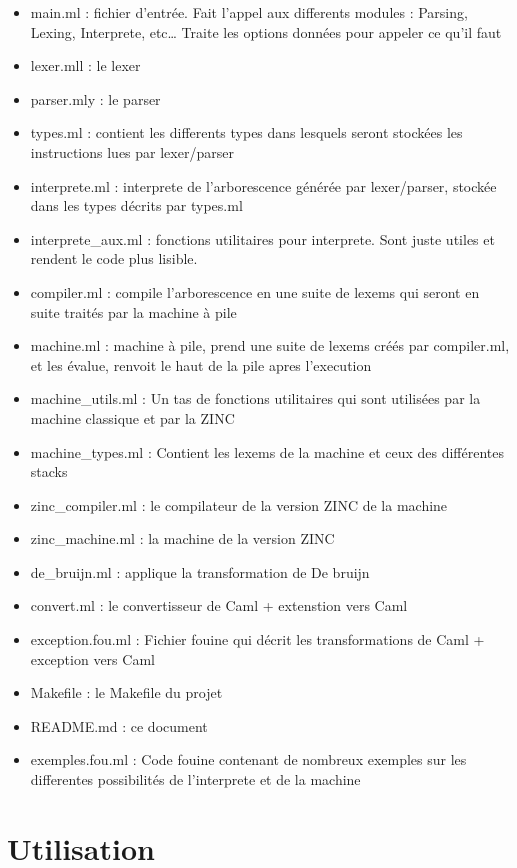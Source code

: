 \begin{itemize}
\tightlist
\item
  main.ml : fichier d'entrée. Fait l'appel aux differents modules :
  Parsing, Lexing, Interprete, etc\ldots{} Traite les options données
  pour appeler ce qu'il faut
\item
  lexer.mll : le lexer
\item
  parser.mly : le parser
\item
  types.ml : contient les differents types dans lesquels seront stockées
  les instructions lues par lexer/parser
\item
  interprete.ml : interprete de l'arborescence générée par lexer/parser,
  stockée dans les types décrits par types.ml
\item
  interprete\_aux.ml : fonctions utilitaires pour interprete. Sont juste
  utiles et rendent le code plus lisible.
\item
  compiler.ml : compile l'arborescence en une suite de lexems qui seront
  en suite traités par la machine à pile
\item
  machine.ml : machine à pile, prend une suite de lexems créés par
  compiler.ml, et les évalue, renvoit le haut de la pile apres
  l'execution
\item
  machine\_utils.ml : Un tas de fonctions utilitaires qui sont utilisées
  par la machine classique et par la ZINC
\item
  machine\_types.ml : Contient les lexems de la machine et ceux des
  différentes stacks
\item
  zinc\_compiler.ml : le compilateur de la version ZINC de la machine
\item
  zinc\_machine.ml : la machine de la version ZINC
\item
  de\_bruijn.ml : applique la transformation de De bruijn
\item
  convert.ml : le convertisseur de Caml + extenstion vers Caml
\item
  exception.fou.ml : Fichier fouine qui décrit les transformations de
  Caml + exception vers Caml
\item
  Makefile : le Makefile du projet
\item
  README.md : ce document
\item
  exemples.fou.ml : Code fouine contenant de nombreux exemples sur les
  differentes possibilités de l'interprete et de la machine
\end{itemize}

\section{Utilisation}\label{utilisation}

